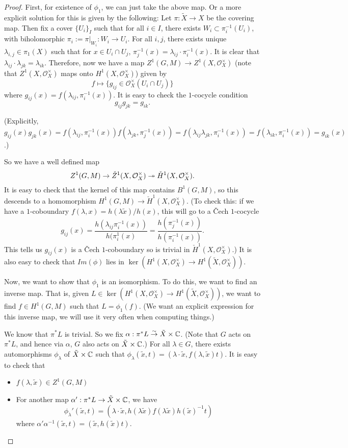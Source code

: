 \begin{proof}
First, for existence of $\phi_1$, we can just take the above map. Or a more explicit solution for this is given by the following: Let $\pi:\tilde{X}\to X$ be the covering map. Then fix a cover $\{U_i\}_I$ such that for all $i\in I$, there exists $W_i\subset \pi_i^{-1}(U_i)$, with biholomorphic $\pi_i:=\pi|_{W_i}:W_i\to U_i$. For all $i,j$, there exists unique $\lambda_{i,j}\in\pi_1(X)$ such that for $x\in U_i\cap U_j$, 
$\pi_j^{-1}(x)=\lambda_{ij}\cdot \pi_i^{-1}(x)$. It is clear that $\lambda_{ij}\cdot \lambda_{jk}=\lambda_{ik}$. Therefore, now we have a map $Z^1(G,M)\to Z^1(X,\mathcal{O}_X^\times)$ (note that $Z^1(X,\mathcal{O}_X^\times)$ maps onto $H^1(X,\mathcal{O}_X^\times)$) given by 
$$f\mapsto \{g_{ij}\in \mathcal{O}_X^\times (U_i\cap U_j)\}$$
where $g_{ij}(x)=f(\lambda_{ij},\pi_i^{-1}(x))$. It is easy to check the $1$-cocycle condition
$$g_{ij}g_{jk}=g_{ik}.$$

(Explicitly, $g_{ij}(x)g_{jk}(x)=f(\lambda_{ij},\pi_i^{-1}(x))f(\lambda_{jk},\pi_j^{-1}(x))=f(\lambda_{ij}\lambda_{jk},\pi_i^{-1}(x))=f(\lambda_{ik},\pi_i^{-1}(x))=g_{ik}(x)$.)

So we have a well defined map 
$$Z^1(G,M)\to \check{Z}^1(X,\mathcal{O}_X^\times)\twoheadrightarrow \check{H}^1(X,\mathcal{O}_X^\times).$$
It is easy to check that the kernel of this map contains $B^1(G,M)$, so this descends to a homomorphism $H^1(G,M)\to \check{H}^1(X,\mathcal{O}_X^\times)$. (To check this: if we have a $1$-coboundary $f(\lambda,x)=h(\lambda\tilde{x})/h(x)$, this will go to a \v{C}ech $1$-cocycle
$$g_{ij}(x)=\frac{h(\lambda_{ij}\pi_i^{-1}(x))}{h(\pi_i^1(x)}=\frac{h(\pi_j^{-1}(x))}{h(\pi_i^{-1}(x))}.$$
This tells us $g_{ij}(x)$ is a \v{C}ech $1$-coboundary so is trivial in $\check{H}^1(X,\mathcal{O}_X^\times)$.)
It is also easy to check that $Im(\phi)$ lies in $\ker(H^1(X,\mathcal{O}_X^\times)\to H^1(\tilde{X},\mathcal{O}_X^\times))$.

Now, we want to show that $\phi_1$ is an isomorphism. 
To do this, we want to find an inverse map. That is, given $L\in \ker(H^1(X,\mathcal{O}_X^\times)\to H^1(\tilde{X},\mathcal{O}_X^\times))$, we want to find $f\in H^1(G,M)$ such that $L=\phi_1(f)$. 
(We want an explicit expression for this inverse map, we will use it very often when computing things.)


We know that $\pi^*L$ is trivial. So we fix $\alpha:\pi^*L\overset{\sim}{\rightarrow} \tilde{X}\times {\mathbb C}$. (Note that $G$ acts on $\pi^*L$, and hence via $\alpha$, $G$ also acts on $\tilde{X}\times {\mathbb C}$.) For all $\lambda\in G$, there exists automorphisms $\phi_\lambda$ of $\tilde{X}\times {\mathbb C}$ such that 
$\phi_\lambda(\tilde{x},t)=(\lambda\cdot \tilde{x},f(\lambda,\tilde{x})t)$. It is easy to check that 
\begin{itemize}
\item $f(\lambda,\tilde{x})\in Z^1(G,M)$
\item For another map $\alpha':\pi^*L\to \tilde{X}\times {\mathbb C}$, we have 
$$\phi_\lambda'(\tilde{x},t)=(\lambda\cdot \tilde{x},h(\lambda\tilde{x})f(\lambda\tilde{x})h(\tilde{x})^{-1}t)$$
where $\alpha'\alpha^{-1}(\tilde{x},t)=(\tilde{x},h(\tilde{x})t)$. 
\end{itemize}
\end{proof}


